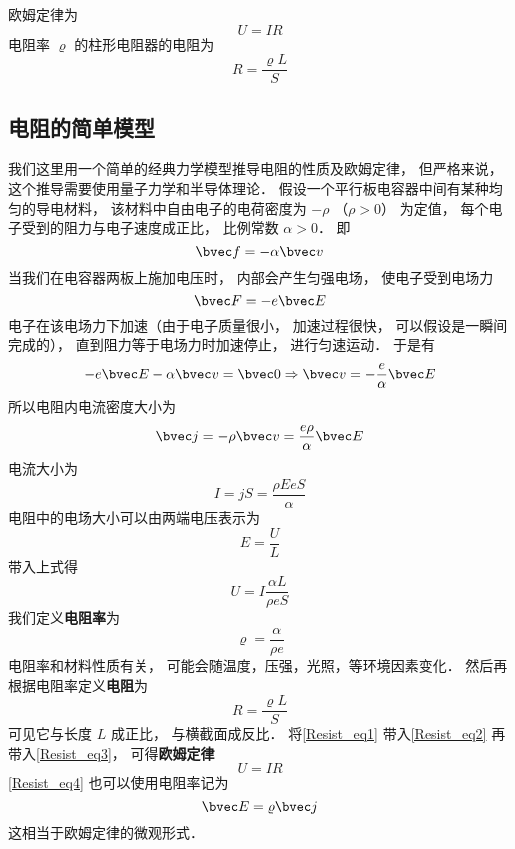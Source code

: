 

欧姆定律为
\begin{equation}
U = IR
\end{equation}
电阻率 $\varrho$ 的柱形电阻器的电阻为
\begin{equation}
R = \frac{\varrho L}{S}
\end{equation}


\subsection{电阻的简单模型}
我们这里用一个简单的经典力学模型推导电阻的性质及欧姆定律， 但严格来说， 这个推导需要使用量子力学和半导体理论． 假设一个平行板电容器中间有某种均匀的导电材料， 该材料中自由电子的电荷密度为 $-\rho$ （$\rho > 0$） 为定值， 每个电子受到的阻力与电子速度成正比， 比例常数 $\alpha > 0$． 即
\begin{equation}
\bvec f = -\alpha \bvec v
\end{equation}
当我们在电容器两板上施加电压时， 内部会产生匀强电场， 使电子受到电场力
\begin{equation}
\bvec F = -e\bvec E
\end{equation}
电子在该电场力下加速（由于电子质量很小， 加速过程很快， 可以假设是一瞬间完成的）， 直到阻力等于电场力时加速停止， 进行匀速运动． 于是有
\begin{equation}
-e\bvec E - \alpha \bvec v = \bvec 0 \Rightarrow \bvec v = -\frac{e}{\alpha}\bvec E
\end{equation}
所以电阻内电流密度大小为
\begin{equation}\label{Resist_eq4}
\bvec j = -\rho \bvec v = \frac{e\rho}{\alpha}\bvec E
\end{equation}
电流大小为
\begin{equation}
I = jS = \frac{\rho EeS}{\alpha}
\end{equation}
电阻中的电场大小可以由两端电压表示为
\begin{equation}
E = \frac UL
\end{equation}
带入上式得
\begin{equation}\label{Resist_eq3}
U = I \frac{\alpha L}{\rho eS}
\end{equation}
我们定义\textbf{电阻率}为
\begin{equation}\label{Resist_eq1}
\varrho = \frac{\alpha}{\rho e}
\end{equation}
电阻率和材料性质有关， 可能会随温度，压强，光照，等环境因素变化． 然后再根据电阻率定义\textbf{电阻}为
\begin{equation}\label{Resist_eq2}
R = \frac{\varrho L}{S}
\end{equation}
可见它与长度 $L$ 成正比， 与横截面成反比． 将\autoref{Resist_eq1} 带入\autoref{Resist_eq2} 再带入\autoref{Resist_eq3}， 可得\textbf{欧姆定律}
\begin{equation}
U = IR
\end{equation}
\autoref{Resist_eq4} 也可以使用电阻率记为
\begin{equation}
\bvec E = \varrho\bvec j
\end{equation}
这相当于欧姆定律的微观形式．
